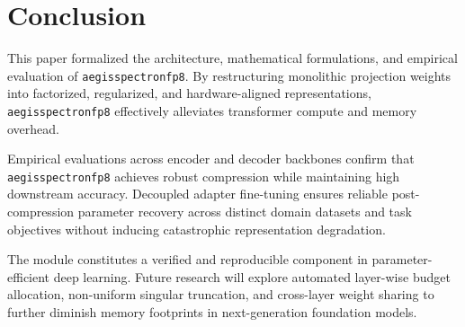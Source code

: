 \section{Conclusion}
This paper formalized the architecture, mathematical formulations, and empirical evaluation of \texttt{aegisspectronfp8}. By restructuring monolithic projection weights into factorized, regularized, and hardware-aligned representations, \texttt{aegisspectronfp8} effectively alleviates transformer compute and memory overhead.

Empirical evaluations across encoder and decoder backbones confirm that \texttt{aegisspectronfp8} achieves robust compression while maintaining high downstream accuracy. Decoupled adapter fine-tuning ensures reliable post-compression parameter recovery across distinct domain datasets and task objectives without inducing catastrophic representation degradation.

The module constitutes a verified and reproducible component in parameter-efficient deep learning. Future research will explore automated layer-wise budget allocation, non-uniform singular truncation, and cross-layer weight sharing to further diminish memory footprints in next-generation foundation models.
